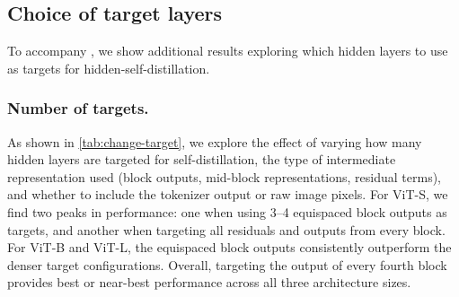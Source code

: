 \FloatBarrier
\subsection{Choice of target layers}

To accompany \iftoggle{arxiv}{\cref{s:ablation:target}}{Sec.~6.1 of the main text}, we show additional results exploring which hidden layers to use as targets for hidden-self-distillation.

\subsubsection{Number of targets.}
\label{s:target-choice}

As shown in \cref{tab:change-target}, we explore the effect of varying how many hidden layers are targeted for self-distillation, the type of intermediate representation used (block outputs, mid-block representations, residual terms), and whether to include the tokenizer output or raw image pixels.
For ViT-S, we find two peaks in performance: one when using 3--4 equispaced block outputs as targets, and another when targeting all residuals and outputs from every block.
For ViT-B and ViT-L, the equispaced block outputs consistently outperform the denser target configurations.
Overall, targeting the output of every fourth block provides best or near-best performance across all three architecture sizes.



